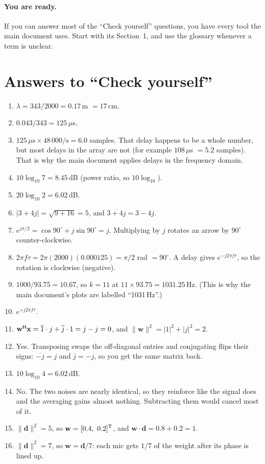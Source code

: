 \documentclass[11pt]{article}
\begin{document}
\paragraph{You are ready.} If you can answer most of the ``Check yourself'' questions, you have every tool the
main document uses. Start with its Section~1, and use the glossary whenever a term is unclear.

\section{Answers to ``Check yourself''}\label{sec:answers}
\begin{enumerate}[leftmargin=2em]
\item $\lambda=343/2000=0.17$\,m $=17$\,cm.
\item $0.043/343=125\,\mu$s.
\item $125\,\mu\text{s}\times48\,000\text{/s}=6.0$ samples. That delay happens to be a whole number,
  but most delays in the array are not (for example $108\,\mu$s $=5.2$ samples). That is why the
  main document applies delays in the frequency domain.
\item $10\log_{10}7=8.45$\,dB (power ratio, so $10\log_{10}$).
\item $20\log_{10}2=6.02$\,dB.
\item $|3+4j|=\sqrt{9+16}=5$, and $\overline{3+4j}=3-4j$.
\item $e^{j\pi/2}=\cos90^\circ+j\sin90^\circ=j$. Multiplying by $j$ rotates an arrow by $90^\circ$
  counter-clockwise.
\item $2\pi f\tau=2\pi(2000)(0.000125)=\pi/2$ rad $=90^\circ$. A delay gives $e^{-j2\pi f\tau}$, so the
  rotation is clockwise (negative).
\item $1000/93.75=10.67$, so $k=11$ at $11\times93.75=1031.25$\,Hz. (This is why the main document's
  plots are labelled ``1031\,Hz''.)
\item $e^{+j2\pi f\tau}$.
\item $\mathbf w^{\mathsf H}\mathbf x=\overline{1}\cdot j+\overline{j}\cdot1=j-j=0$, and
  $\|\mathbf w\|^2=|1|^2+|j|^2=2$.
\item Yes. Transposing swaps the off-diagonal entries and conjugating flips their signs:
  $\overline{-j}=j$ and $\overline{j}=-j$, so you get the same matrix back.
\item $10\log_{10}4=6.02$\,dB.
\item No. The two noises are nearly identical, so they reinforce like the signal does and the
  averaging gains almost nothing. Subtracting them would cancel most of it.
\item $\|\mathbf d\|^2=5$, so $\mathbf w=[0.4,\ 0.2]^{\mathsf T}$, and $\mathbf w\cdot\mathbf d=0.8+0.2=1$.
\item $\|\mathbf d\|^2=7$, so $\mathbf w=\mathbf d/7$: each mic gets $1/7$ of the weight after its
  phase is lined up.
\end{enumerate}
\end{document}
